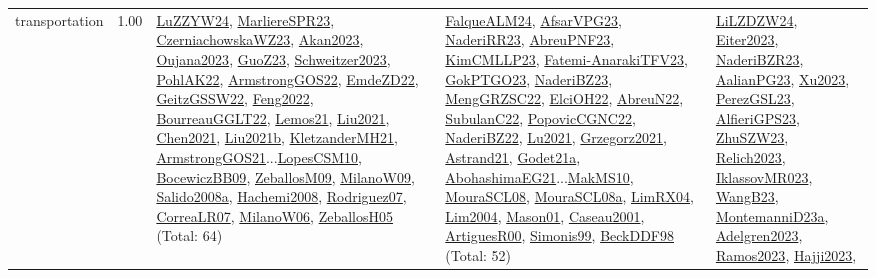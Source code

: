 {\begin{longtable}{p{3cm}r>{\raggedright\arraybackslash}p{6cm}>{\raggedright\arraybackslash}p{6cm}>{\raggedright\arraybackslash}p{8cm}}
\index{transportation}\index{Concepts!transportation}transportation &  1.00 & \hyperref[detail:LuZZYW24]{LuZZYW24}, \hyperref[detail:MarliereSPR23]{MarliereSPR23}, \hyperref[detail:CzerniachowskaWZ23]{CzerniachowskaWZ23}, \hyperref[detail:Akan2023]{Akan2023}, \hyperref[detail:Oujana2023]{Oujana2023}, \hyperref[detail:GuoZ23]{GuoZ23}, \hyperref[detail:Schweitzer2023]{Schweitzer2023}, \hyperref[detail:PohlAK22]{PohlAK22}, \hyperref[detail:ArmstrongGOS22]{ArmstrongGOS22}, \hyperref[detail:EmdeZD22]{EmdeZD22}, \hyperref[detail:GeitzGSSW22]{GeitzGSSW22}, \hyperref[detail:Feng2022]{Feng2022}, \hyperref[detail:BourreauGGLT22]{BourreauGGLT22}, \hyperref[detail:Lemos21]{Lemos21}, \hyperref[detail:Liu2021]{Liu2021}, \hyperref[detail:Chen2021]{Chen2021}, \hyperref[detail:Liu2021b]{Liu2021b}, \hyperref[detail:KletzanderMH21]{KletzanderMH21}, \hyperref[detail:ArmstrongGOS21]{ArmstrongGOS21}...\hyperref[detail:LopesCSM10]{LopesCSM10}, \hyperref[detail:BocewiczBB09]{BocewiczBB09}, \hyperref[detail:ZeballosM09]{ZeballosM09}, \hyperref[detail:MilanoW09]{MilanoW09}, \hyperref[detail:Salido2008a]{Salido2008a}, \hyperref[detail:Hachemi2008]{Hachemi2008}, \hyperref[detail:Rodriguez07]{Rodriguez07}, \hyperref[detail:CorreaLR07]{CorreaLR07}, \hyperref[detail:MilanoW06]{MilanoW06}, \hyperref[detail:ZeballosH05]{ZeballosH05} (Total: 64) & \hyperref[detail:FalqueALM24]{FalqueALM24}, \hyperref[detail:AfsarVPG23]{AfsarVPG23}, \hyperref[detail:NaderiRR23]{NaderiRR23}, \hyperref[detail:AbreuPNF23]{AbreuPNF23}, \hyperref[detail:KimCMLLP23]{KimCMLLP23}, \hyperref[detail:Fatemi-AnarakiTFV23]{Fatemi-AnarakiTFV23}, \hyperref[detail:GokPTGO23]{GokPTGO23}, \hyperref[detail:NaderiBZ23]{NaderiBZ23}, \hyperref[detail:MengGRZSC22]{MengGRZSC22}, \hyperref[detail:ElciOH22]{ElciOH22}, \hyperref[detail:AbreuN22]{AbreuN22}, \hyperref[detail:SubulanC22]{SubulanC22}, \hyperref[detail:PopovicCGNC22]{PopovicCGNC22}, \hyperref[detail:NaderiBZ22]{NaderiBZ22}, \hyperref[detail:Lu2021]{Lu2021}, \hyperref[detail:Grzegorz2021]{Grzegorz2021}, \hyperref[detail:Astrand21]{Astrand21}, \hyperref[detail:Godet21a]{Godet21a}, \hyperref[detail:AbohashimaEG21]{AbohashimaEG21}...\hyperref[detail:MakMS10]{MakMS10}, \hyperref[detail:MouraSCL08]{MouraSCL08}, \hyperref[detail:MouraSCL08a]{MouraSCL08a}, \hyperref[detail:LimRX04]{LimRX04}, \hyperref[detail:Lim2004]{Lim2004}, \hyperref[detail:Mason01]{Mason01}, \hyperref[detail:Caseau2001]{Caseau2001}, \hyperref[detail:ArtiguesR00]{ArtiguesR00}, \hyperref[detail:Simonis99]{Simonis99}, \hyperref[detail:BeckDDF98]{BeckDDF98} (Total: 52) & \hyperref[detail:LiLZDZW24]{LiLZDZW24}, \hyperref[detail:Eiter2023]{Eiter2023}, \hyperref[detail:NaderiBZR23]{NaderiBZR23}, \hyperref[detail:AalianPG23]{AalianPG23}, \hyperref[detail:Xu2023]{Xu2023}, \hyperref[detail:PerezGSL23]{PerezGSL23}, \hyperref[detail:AlfieriGPS23]{AlfieriGPS23}, \hyperref[detail:ZhuSZW23]{ZhuSZW23}, \hyperref[detail:Relich2023]{Relich2023}, \hyperref[detail:IklassovMR023]{IklassovMR023}, \hyperref[detail:WangB23]{WangB23}, \hyperref[detail:MontemanniD23a]{MontemanniD23a}, \hyperref[detail:Adelgren2023]{Adelgren2023}, \hyperref[detail:Ramos2023]{Ramos2023}, \hyperref[detail:Hajji2023]{Hajji2023}, 
\end{longtable}}
